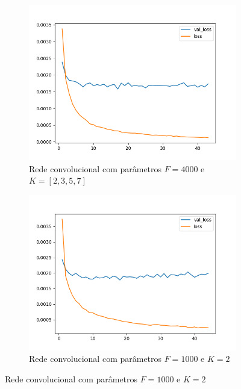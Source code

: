 \begin{figure}[H]
\begin{subfigure}{.5\textwidth}
  \label{fig:cnn-2000}
\end{subfigure}
\begin{subfigure}{.5\textwidth}
  \centering
  \caption{Rede convolucional com parâmetros $F = 4000$ e $K = [2, 3, 5, 7]$}
  \includegraphics[width=.8\linewidth]{figuras/ape-ajustes-hiper-parametros/cnn-4000.png}
  
  \label{fig:cnn-4000}
\end{subfigure}
\begin{subfigure}{.5\textwidth}
  \centering
  \caption{Rede convolucional com parâmetros $F = 1000$ e $K = 2$}
  \includegraphics[width=.8\linewidth]{figuras/ape-ajustes-hiper-parametros/cnn-1000-k-2.png}
  

\end{subfigure}
\end{figure}
